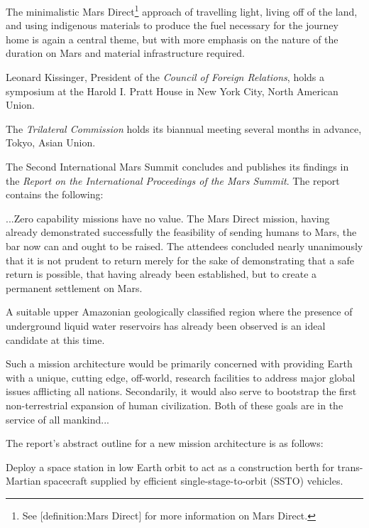 The minimalistic Mars Direct\footnote{See [definition:Mars Direct] for more information on Mars Direct.} approach of travelling light, living off of the land, and using indigenous materials to produce the fuel necessary for the journey home is again a central theme, but with more emphasis on the nature of the duration on Mars and material infrastructure required.
\StopTimelineDate

Leonard Kissinger, President of the {\it Council of Foreign Relations}, holds a symposium at the Harold I. Pratt House in New York City, North American Union.
\StopTimelineDate

The {\it Trilateral Commission} holds its biannual meeting several months in advance, Tokyo, Asian Union.
\StopTimelineDate

The Second International Mars Summit concludes and publishes its findings in the {\it Report on the International Proceedings of the Mars Summit}. The report contains the following:

\startTimelineGeneralDocument
...Zero capability missions have no value. The Mars Direct mission, having already demonstrated successfully the feasibility of sending humans to Mars, the bar now can and ought to be raised. The attendees concluded nearly unanimously that it is not prudent to return merely for the sake of demonstrating that a safe return is possible, that having already been established, but to create a permanent settlement on Mars. 

A suitable upper Amazonian geologically classified region where the presence of underground liquid water reservoirs has already been observed is an ideal candidate at this time. 

Such a mission architecture would be primarily concerned with providing Earth with a unique, cutting edge, off-world, research facilities to address major global issues afflicting all nations. Secondarily, it would also serve to bootstrap the first non-terrestrial expansion of human civilization. Both of these goals are in the service of all mankind...
\stopTimelineGeneralDocument

The report's abstract outline for a new mission architecture is as follows:

\startitemize[R]
\item Deploy a space station in low Earth orbit to act as a construction berth for trans-Martian spacecraft supplied by efficient single-stage-to-orbit (SSTO) vehicles.

